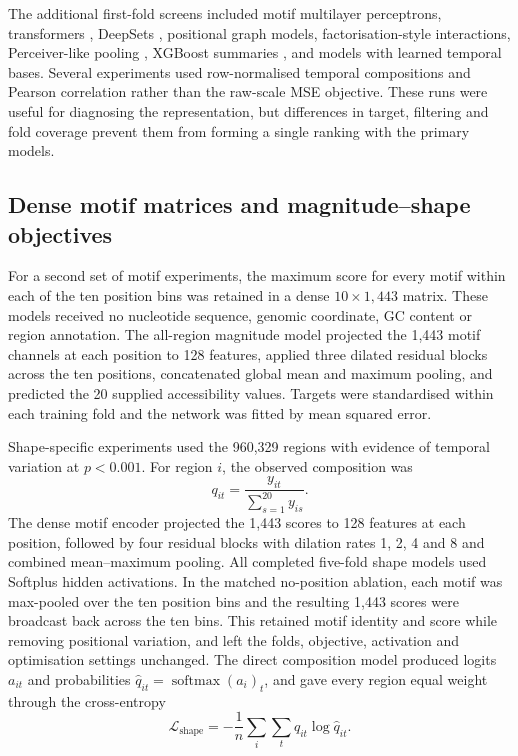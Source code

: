 \documentclass[a4paper,12pt]{article}
\begin{document}
The additional first-fold screens included motif multilayer perceptrons, transformers \citep{vaswani2017attention}, DeepSets \citep{zaheer2017deepsets}, positional graph models, factorisation-style interactions, Perceiver-like pooling \citep{jaegle2021perceiver}, XGBoost summaries \citep{chen2016xgboost}, and models with learned temporal bases. Several experiments used row-normalised temporal compositions and Pearson correlation rather than the raw-scale MSE objective. These runs were useful for diagnosing the representation, but differences in target, filtering and fold coverage prevent them from forming a single ranking with the primary models.

\subsection{Dense motif matrices and magnitude--shape objectives}

For a second set of motif experiments, the maximum score for every motif within each of the ten position bins was retained in a dense $10\times1{,}443$ matrix. These models received no nucleotide sequence, genomic coordinate, GC content or region annotation. The all-region magnitude model projected the 1,443 motif channels at each position to 128 features, applied three dilated residual blocks across the ten positions, concatenated global mean and maximum pooling, and predicted the 20 supplied accessibility values. Targets were standardised within each training fold and the network was fitted by mean squared error.

Shape-specific experiments used the 960,329 regions with evidence of temporal variation at $p<0.001$. For region $i$, the observed composition was
\[
q_{it}=\frac{y_{it}}{\sum_{s=1}^{20}y_{is}}.
\]
The dense motif encoder projected the 1,443 scores to 128 features at each position, followed by four residual blocks with dilation rates 1, 2, 4 and 8 and combined mean--maximum pooling. All completed five-fold shape models used Softplus hidden activations. In the matched no-position ablation, each motif was max-pooled over the ten position bins and the resulting 1,443 scores were broadcast back across the ten bins. This retained motif identity and score while removing positional variation, and left the folds, objective, activation and optimisation settings unchanged. The direct composition model produced logits $a_{it}$ and probabilities $\widehat q_{it}=\operatorname{softmax}(a_i)_t$, and gave every region equal weight through the cross-entropy
\[
\mathcal L_{\mathrm{shape}}=-\frac{1}{n}\sum_i\sum_t q_{it}\log\widehat q_{it}.
\]
\end{document}
